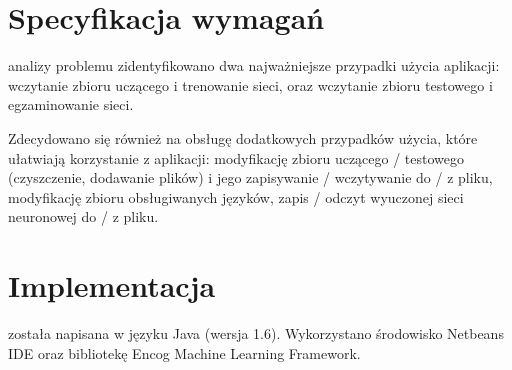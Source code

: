 \documentclass[journal]{IEEEtran}
\begin{document}
%



\section{Specyfikacja wymagań}
 analizy problemu zidentyfikowano dwa najważniejsze przypadki użycia aplikacji: wczytanie
zbioru uczącego i trenowanie sieci, oraz wczytanie zbioru testowego i egzaminowanie sieci.

Zdecydowano się również na obsługę dodatkowych przypadków użycia, które ułatwiają korzystanie z aplikacji:
modyfikację zbioru uczącego / testowego (czyszczenie, dodawanie plików) i jego zapisywanie / wczytywanie do / z pliku,
modyfikację zbioru obsługiwanych języków, zapis / odczyt wyuczonej sieci neuronowej do / z pliku.


\section{Implementacja}
 została napisana w języku Java (wersja 1.6). Wykorzystano środowisko Netbeans IDE
oraz bibliotekę Encog Machine Learning Framework.
\end{document}
